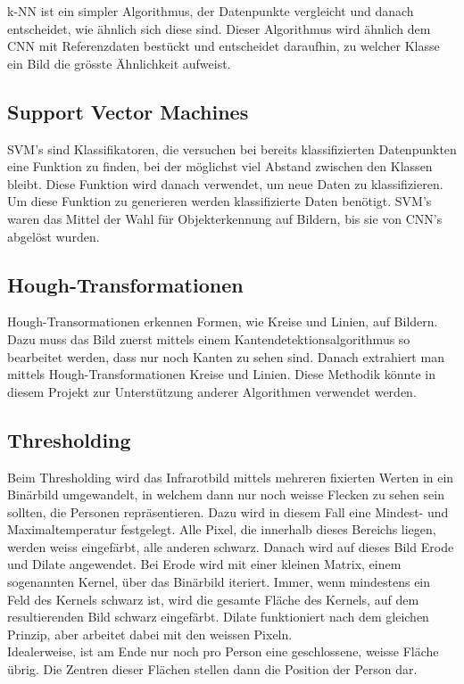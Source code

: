 \gls{k-NN} ist ein simpler Algorithmus, der Datenpunkte vergleicht und danach entscheidet, wie ähnlich sich diese sind. Dieser Algorithmus wird ähnlich dem \gls{CNN} mit Referenzdaten bestückt und entscheidet daraufhin, zu welcher Klasse ein Bild die grösste Ähnlichkeit aufweist.

\subsection{Support Vector Machines}

\gls{SVM}'s sind Klassifikatoren, die versuchen bei bereits klassifizierten Datenpunkten eine Funktion zu finden, bei der möglichst viel Abstand zwischen den Klassen bleibt. Diese Funktion wird danach verwendet, um neue Daten zu klassifizieren. Um diese Funktion zu generieren werden klassifizierte Daten benötigt. \gls{SVM}'s waren das Mittel der Wahl für Objekterkennung auf Bildern, bis sie von \gls{CNN}'s abgelöst wurden.

\subsection{Hough-Transformationen}

Hough-Transormationen erkennen Formen, wie Kreise und Linien, auf Bildern. Dazu muss das Bild zuerst mittels einem Kantendetektionsalgorithmus so bearbeitet werden, dass nur noch Kanten zu sehen sind. Danach extrahiert man mittels Hough-Transformationen Kreise und Linien. Diese Methodik könnte in diesem Projekt zur Unterstützung anderer Algorithmen verwendet werden.


\subsection{Thresholding}

Beim Thresholding wird das Infrarotbild mittels mehreren fixierten Werten in ein Binärbild umgewandelt, in welchem dann nur noch weisse Flecken zu sehen sein sollten, die Personen repräsentieren. Dazu wird in diesem Fall eine Mindest- und Maximaltemperatur festgelegt. Alle Pixel, die innerhalb dieses Bereichs liegen, werden weiss eingefärbt, alle anderen schwarz. Danach wird auf dieses Bild \gls{Erode} und \gls{Dilate} angewendet. Bei \gls{Erode} wird mit einer kleinen Matrix, einem sogenannten Kernel, über das Binärbild iteriert. Immer, wenn mindestens ein Feld des Kernels schwarz ist, wird die gesamte Fläche des Kernels, auf dem resultierenden Bild schwarz eingefärbt. \gls{Dilate} funktioniert nach dem gleichen Prinzip, aber arbeitet dabei mit den weissen Pixeln.\\
Idealerweise, ist am Ende nur noch pro Person eine geschlossene, weisse Fläche übrig. Die Zentren dieser Flächen stellen dann die Position der Person dar.


